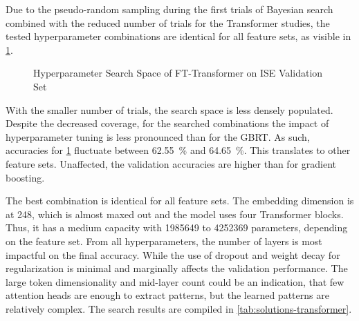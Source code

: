 Due to the pseudo-random sampling during the first trials of Bayesian search combined with the reduced number of trials for the Transformer studies, the tested hyperparameter combinations are identical for all feature sets, as visible in \cref{fig:ise-transformer-hyperparam}.

\begin{figure}[!h]
    \vfill
    \caption[Hyperparameter Search Space of FT-Transformer]{Hyperparameter Search Space of FT-Transformer on \gls{ISE} Validation Set}
    \label{fig:ise-transformer-hyperparam}
\end{figure}
\clearpage
\begin{figure}[!ht]
    \ContinuedFloat
\end{figure}

With the smaller number of trials, the search space is less densely populated. Despite the decreased coverage, for the searched combinations the impact of hyperparameter tuning is less pronounced than for the \gls{GBRT}. As such, accuracies for \cref{fig:ise-transformer-hyperparam} fluctuate between \SI{62.55}{\percent} and \SI{64.65}{\percent}. This translates to other feature sets. Unaffected, the validation accuracies are higher than for gradient boosting.

The best combination is identical for all feature sets. The embedding dimension is at \num{248}, which is almost maxed out and the model uses four Transformer blocks. Thus, it has a medium capacity with \num{1985649} to \num{4252369} parameters, depending on the feature set. From all hyperparameters, the number of layers is most impactful on the final accuracy. While the use of dropout and weight decay for regularization is minimal and marginally affects the validation performance. The large token dimensionality and mid-layer count could be an indication, that few attention heads are enough to extract patterns, but the learned patterns are relatively complex. The search results are compiled in \cref{tab:solutions-transformer}.

